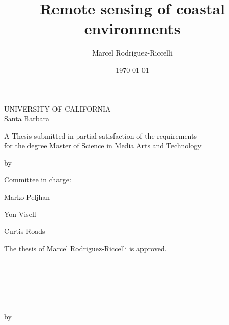 \documentclass{article}
\title{Remote sensing of coastal environments}
\author{Marcel Rodriguez-Riccelli}
\date{\today}
\begin{document}
\begin{center}
\thispagestyle{empty}
\par{UNIVERSITY OF CALIFORNIA \\[.5cm] Santa Barbara} 
\vspace{1.25cm}
\par{\huge \thetitle}
\vspace{1.5cm}
\par{A Thesis submitted in partial satisfaction of the requirements \\ for the degree Master of Science in Media Arts and Technology}
\vspace{1cm}
{by \par}
\vspace{1cm}
{\theauthor}
\vspace{1.5cm}
\par{Committee in charge:}
\vspace{1cm}
\par{Marko Peljhan}
\vspace{1cm}
\par{Yon Visell}
\vspace{1cm}
\par{Curtis Roads}
\vspace{2cm}
\par{\thedate}
\end{center}

\newpage
\thispagestyle{empty}
\begin{center}
\par{The thesis of Marcel Rodriguez-Riccelli is approved.}
\vspace{2cm}
\par{\makebox[10cm][l]{\rule{10cm}{0.4pt}}\\
}
\vspace{1cm}
\par{\makebox[10cm][l]{\rule{10cm}{0.4pt}}\\
}
\vspace{1cm}
\par{\makebox[10cm][l]{\rule{10cm}{0.4pt}}\\
}
\vspace{2cm}
\par{\thedate}
\end{center}

\newpage
{}
\begin{center}
\vspace{1cm}
\par{\thetitle}
\vspace{1cm}
\par{by}
\vspace{1cm}
\par{\theauthor}
\vspace{1cm}
\end{center}
\doublespacing
\end{document}
